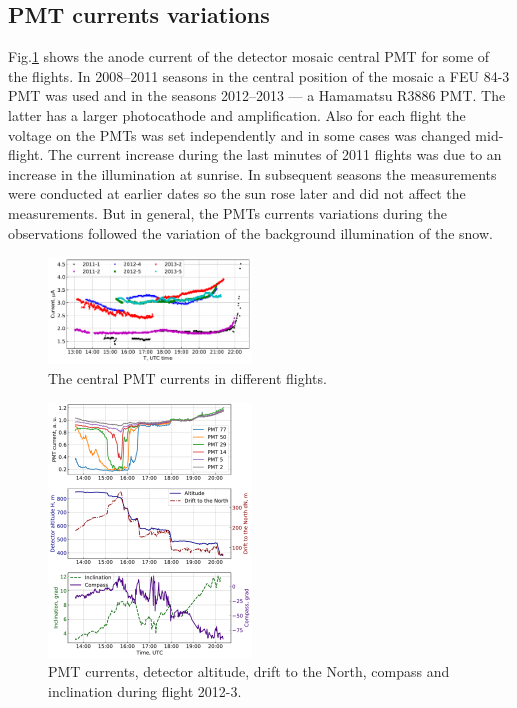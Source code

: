 \documentclass[final,5p,times,twocolumn]{elsarticle}
\begin{document}
\subsection{PMT currents variations}

 Fig.\ref{fig:current} shows the anode current of the detector mosaic central PMT for some of the flights. In 2008--2011 seasons in the central position of the mosaic a FEU 84-3 PMT was used and in the seasons 2012--2013 --- a Hamamatsu R3886 PMT. The latter has a larger photocathode and amplification. Also for each flight the voltage on the PMTs was set independently and in some cases was changed mid-flight. The current increase during the last minutes of 2011 flights was due to an increase in the illumination at sunrise. In subsequent seasons the measurements were conducted at earlier dates so the sun rose later and did not affect the measurements. But in general, the PMTs currents variations during the observations followed the variation of the background illumination of the snow.

\begin{figure}[tb]
    \includegraphics[width=0.48\textwidth]{hv-53.pdf}
    \caption{The central PMT currents in different flights.}
\label{fig:current}
\end{figure}

\begin{figure}[tb]
    \includegraphics[width=0.48\textwidth]{2012-3_currents_H_dN.pdf}
    \caption{PMT currents, detector altitude, drift to the North, compass and inclination during flight 2012-3.}
    \label{fig:2012-3_currents}
\end{figure}
\end{document}
